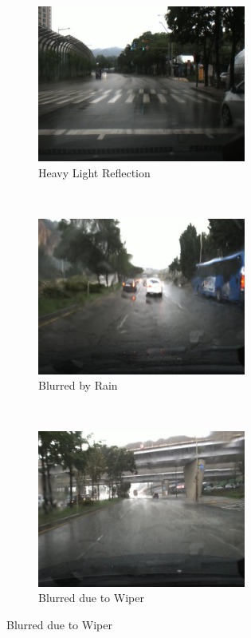 \begin{spacing}{1.5}
\begin{figure}[!ht]
    \centering
    \begin{subfigure}[b]{0.49\textwidth}
        \centering
        \includegraphics[width=2.7in, fbox]{Chapter5/scene_2-20160510_1302_22-000181.png}
        \caption{Heavy Light Reflection}
        \label{fig:heavylight}
    \end{subfigure}%
    ~
    \begin{subfigure}[b]{0.49\textwidth}
        \centering
        \includegraphics[width=2.7in, fbox]{Chapter5/scene_3-20160809_1423_33-000091.png}
        \caption{Blurred by Rain}
        \label{fig:blurbyrain}
    \end{subfigure}
    \\
    \begin{subfigure}[b]{0.49\textwidth}
        \centering
        \includegraphics[width=2.7in, fbox]{Chapter5/scene_3-20160809_1425_34-000091.png}
        \caption{Blurred due to Wiper}
        \label{fig:blurbywiper}
    \end{subfigure}%

\end{figure}
\end{spacing}
